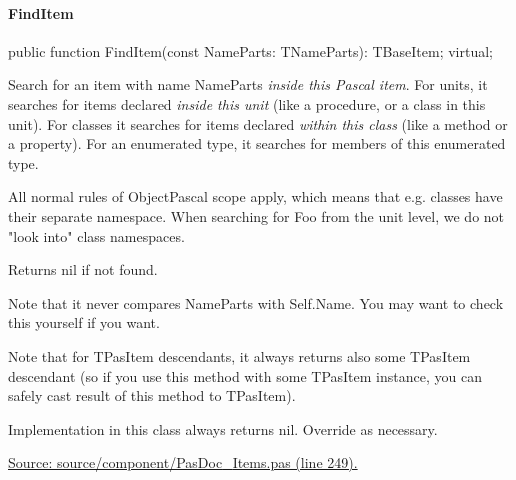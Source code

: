 \documentclass{report}
\newif\ifpdf
\begin{document}
\paragraph*{FindItem}\hspace*{\fill}

\label{PasDoc_Items.TBaseItem-FindItem}
\begin{list}{}{
\setlength{\itemindent}{0cm}
\setlength{\listparindent}{0cm}
\setlength{\leftmargin}{\evensidemargin}
\addtolength{\leftmargin}{\tmplength}
\settowidth{\labelsep}{X}
\addtolength{\leftmargin}{\labelsep}
\setlength{\labelwidth}{\tmplength}
}
\item[\textbf{Declaration}\hfill]
\ifpdf
\begin{flushleft}
\fi
\begin{ttfamily}
public function FindItem(const NameParts: TNameParts): TBaseItem; virtual;\end{ttfamily}

\ifpdf
\end{flushleft}
\fi

\par
\item[\textbf{Description}]
Search for an item with name NameParts \textit{inside this Pascal item}. For units, it searches for items declared \textit{inside this unit} (like a procedure, or a class in this unit). For classes it searches for items declared \textit{within this class} (like a method or a property). For an enumerated type, it searches for members of this enumerated type.

All normal rules of ObjectPascal scope apply, which means that e.g. classes have their separate namespace. When searching for Foo from the unit level, we do not "look into" class namespaces.

Returns nil if not found.

Note that it never compares NameParts with Self.Name. You may want to check this yourself if you want.

Note that for TPasItem descendants, it always returns also some TPasItem descendant (so if you use this method with some TPasItem instance, you can safely cast result of this method to TPasItem).

Implementation in this class always returns nil. Override as necessary.\par
\href{https://github.com/pasdoc/pasdoc/blob/master/source/component/PasDoc_Items.pas#L249}{Source: source/component/PasDoc{\_}Items.pas (line 249).}

\end{list}
\end{document}
